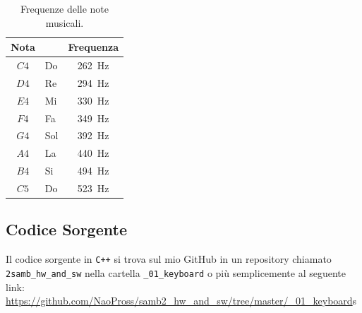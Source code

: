 \documentclass[a4paper]{article}
\begin{document}
			\begin{table}[h]
				\begin{center} \begin{tabular}{ | c l | c | }
					\hline
					Nota  & & Frequenza \\
					\hline
					$C4$ & Do & \SI{262}{\hertz} \\
					$D4$ & Re & \SI{294}{\hertz} \\
					$E4$ & Mi & \SI{330}{\hertz} \\
					$F4$ & Fa & \SI{349}{\hertz} \\
					$G4$ & Sol & \SI{392}{\hertz} \\
					$A4$ & La & \SI{440}{\hertz} \\
					$B4$ & Si & \SI{494}{\hertz} \\
					$C5$ & Do & \SI{523}{\hertz} \\
					\hline
				\end{tabular} \end{center}
				\caption{Frequenze delle note musicali.}
			\end{table}
		
		\subsection{Codice Sorgente}
			Il codice sorgente in \texttt{C++} si trova sul mio GitHub in un repository
			chiamato \texttt{2samb\_hw\_and\_sw} nella cartella \texttt{\_01\_keyboard} o più semplicemente
			al seguente link: \\
			\url{https://github.com/NaoPross/samb2_hw_and_sw/tree/master/_01_keyboard}s
\end{document}
